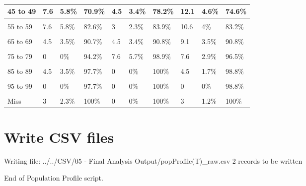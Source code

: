 \documentclass[
]{article}
\begin{document}
\begin{table}
\begin{tabular}[t]{l|l|l|l|l|l|l|l|l|l}
\hline
45 to 49 & 7.6 & 5.8\% & 70.9\% & 4.5 & 3.4\% & 78.2\% & 12.1 & 4.6\% & 74.6\%\\
\hline
\cellcolor{gray!10}{50 to 54} & \cellcolor{gray!10}{7.6} & \cellcolor{gray!10}{5.8\%} & \cellcolor{gray!10}{76.7\%} & \cellcolor{gray!10}{4.5} & \cellcolor{gray!10}{3.4\%} & \cellcolor{gray!10}{81.6\%} & \cellcolor{gray!10}{12.1} & \cellcolor{gray!10}{4.6\%} & \cellcolor{gray!10}{79.2\%}\\
\hline
55 to 59 & 7.6 & 5.8\% & 82.6\% & 3 & 2.3\% & 83.9\% & 10.6 & 4\% & 83.2\%\\
\hline
\cellcolor{gray!10}{60 to 64} & \cellcolor{gray!10}{6.1} & \cellcolor{gray!10}{4.7\%} & \cellcolor{gray!10}{87.2\%} & \cellcolor{gray!10}{4.5} & \cellcolor{gray!10}{3.4\%} & \cellcolor{gray!10}{87.4\%} & \cellcolor{gray!10}{10.6} & \cellcolor{gray!10}{4\%} & \cellcolor{gray!10}{87.3\%}\\
\hline
65 to 69 & 4.5 & 3.5\% & 90.7\% & 4.5 & 3.4\% & 90.8\% & 9.1 & 3.5\% & 90.8\%\\
\hline
\cellcolor{gray!10}{70 to 74} & \cellcolor{gray!10}{4.5} & \cellcolor{gray!10}{3.5\%} & \cellcolor{gray!10}{94.2\%} & \cellcolor{gray!10}{3} & \cellcolor{gray!10}{2.3\%} & \cellcolor{gray!10}{93.1\%} & \cellcolor{gray!10}{7.6} & \cellcolor{gray!10}{2.9\%} & \cellcolor{gray!10}{93.6\%}\\
\hline
75 to 79 & 0 & 0\% & 94.2\% & 7.6 & 5.7\% & 98.9\% & 7.6 & 2.9\% & 96.5\%\\
\hline
\cellcolor{gray!10}{80 to 84} & \cellcolor{gray!10}{0} & \cellcolor{gray!10}{0\%} & \cellcolor{gray!10}{94.2\%} & \cellcolor{gray!10}{1.5} & \cellcolor{gray!10}{1.1\%} & \cellcolor{gray!10}{100\%} & \cellcolor{gray!10}{1.5} & \cellcolor{gray!10}{0.6\%} & \cellcolor{gray!10}{97.1\%}\\
\hline
85 to 89 & 4.5 & 3.5\% & 97.7\% & 0 & 0\% & 100\% & 4.5 & 1.7\% & 98.8\%\\
\hline
\cellcolor{gray!10}{90 to 94} & \cellcolor{gray!10}{0} & \cellcolor{gray!10}{0\%} & \cellcolor{gray!10}{97.7\%} & \cellcolor{gray!10}{0} & \cellcolor{gray!10}{0\%} & \cellcolor{gray!10}{100\%} & \cellcolor{gray!10}{0} & \cellcolor{gray!10}{0\%} & \cellcolor{gray!10}{98.8\%}\\
\hline
95 to 99 & 0 & 0\% & 97.7\% & 0 & 0\% & 100\% & 0 & 0\% & 98.8\%\\
\hline
\cellcolor{gray!10}{100 to 104} & \cellcolor{gray!10}{0} & \cellcolor{gray!10}{0\%} & \cellcolor{gray!10}{97.7\%} & \cellcolor{gray!10}{0} & \cellcolor{gray!10}{0\%} & \cellcolor{gray!10}{100\%} & \cellcolor{gray!10}{0} & \cellcolor{gray!10}{0\%} & \cellcolor{gray!10}{98.8\%}\\
\hline
Miss & 3 & 2.3\% & 100\% & 0 & 0\% & 100\% & 3 & 1.2\% & 100\%\\
\hline
\end{tabular}
\end{table}

\section{Write CSV files}\label{write-csv-files}

Writing file: ../../CSV/05 - Final Analysis
Output/popProfile(T)\_raw.csv 2 records to be written

End of Population Profile script.
\end{document}
